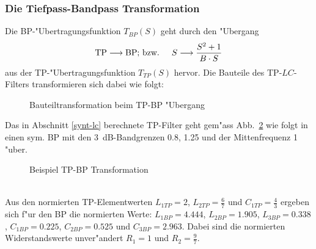 \subsubsection{Die Tiefpass-Bandpass Transformation}
Die BP-"Ubertragungsfunktion $T_{BP}(S)$ geht durch den "Ubergang
\begin{eqnarray*}
{\rm TP}\longrightarrow  {\rm BP}&\text{; bzw.    }& S  \longrightarrow  \frac{S^2 + 1}{B \cdot S}
\end{eqnarray*}
aus der TP-"Ubertragungsfunktion $T_{TP}(S)$ hervor. Die Bauteile
des TP-$LC$-Filters transformieren sich dabei wie folgt:
\begin{figure}[!htb]
\begin{center}
  \caption{Bauteiltransformation beim TP-BP "Ubergang}\label{filter_TP-BP-trafo}
\end{center}
\vspace*{-6mm}
\end{figure}
\bsp{} Das in Abschnitt \ref{synt-lc} berechnete TP-Filter geht
gem"ass Abb.~\ref{tp-bp-trans} wie folgt in einen sym. BP mit den
3~dB-Bandgrenzen 0.8, 1.25 und der
Mittenfrequenz 1 "uber.
\begin{figure}[!htb]
\vspace*{-3mm}
\begin{center}
  \caption{Beispiel TP-BP Transformation\label{tp-bp-trans}}
\end{center}
\vspace*{-6mm}
\end{figure}\\
\nit Aus den normierten TP-Elementwerten $L_{1TP}=2$, $L_{2TP}=\frac{6}{7}$ und $C_{1TP}=\frac{4}{3}$
ergeben sich f"ur den BP die normierten Werte: $L_{1BP}=4.444$, $L_{2BP}=1.905$, $L_{3BP}=0.338$,  
$C_{1BP}=0.225$, $C_{2BP}=0.525$ und $C_{3BP}=2.963$.
Dabei sind die normierten Widerstandswerte unver"andert $R_1=1$
und $R_2=\frac{9}{7}$.
